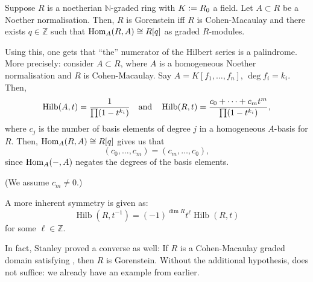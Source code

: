 \documentclass[12pt]{article}
\DeclareMathOperator{\Hilb}{Hilb}
\begin{document}
\begin{ex}
	Suppose $R$ is a noetherian $\mathbb{N}$-graded ring with $K \vcentcolon= R_{0}$ a field. Let $A \subset R$ be a Noether normalisation. Then, $R$ is Gorenstein iff $R$ is Cohen-Macaulay and there exists $q \in \mathbb{Z}$ such that $\operatorname{Hom}_{A}(R, A) \cong R[q]$ as graded $R$-modules.

	Using this, one gets that ``the'' numerator of the Hilbert series is a palindrome. More precisely: consider $A \subset R$, where $A$ is a homogeneous Noether normalisation and $R$ is Cohen-Macaulay. Say $A = K[f_{1}, \ldots, f_{n}]$, $\deg f_{i} = k_{i}$. Then,
	\begin{equation*} 
		\Hilb(A, t) = \frac{1}{\prod (1 - t^{k_{i}})} \andd \Hilb(R, t) = \frac{c_{0} + \cdots + c_{m} t^{m}}{\prod (1 - t^{k_{i}})},
	\end{equation*}
	where $c_{j}$ is the number of basis elements of degree $j$ in a homogeneous $A$-basis for $R$. Then, $\operatorname{Hom}_{A}(R, A) \cong R[q]$ gives us that
	\begin{equation*} 
		(c_{0}, \ldots, c_{m}) = (c_{m}, \ldots, c_{0}),
	\end{equation*}
	since $\operatorname{Hom}_{A}(-, A)$ negates the degrees of the basis elements.

	(We assume $c_{m} \neq 0$.)

	A more inherent symmetry is given as:
	\begin{equation} \label{eq:01}
		\Hilb(R, t^{-1}) = (-1)^{\dim R} t^{\ell} \Hilb(R, t)
	\end{equation}
	for some $\ell \in \mathbb{Z}$.

	In fact, Stanley proved a converse as well: If $R$ is a Cohen-Macaulay graded domain satisfying , then $R$ is Gorenstein. \newline
	Without the additional hypothesis,  does not suffice: we already have an example from earlier.
\end{ex}
\end{document}
